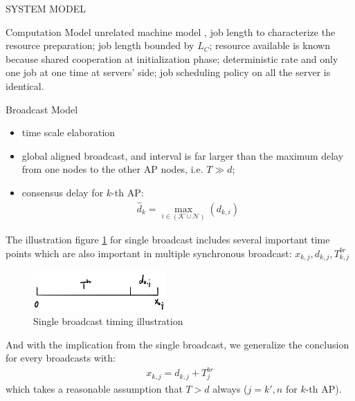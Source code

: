 \documentclass[10pt, conference, letterpaper]{IEEEtran}
\begin{document}
\begin{section}{SYSTEM MODEL}
        \begin{subsection}{Computation Model}
            unrelated machine model \cite{tan-online}, job length to characterize the resource preparation;
            job length bounded by $L_C$;
            resource available is known because shared cooperation at initialization phase;
            deterministic rate and only one job at one time at servers' side;
            job scheduling policy on all the server is identical.
        \end{subsection}

        \begin{subsection}{Broadcast Model}
            \begin{itemize}
                \item time scale elaboration
                \item global aligned broadcast, and interval is far larger than the maximum delay from one nodes to the other AP nodes, i.e. $T \gg d$;
                \item consensus delay for $k$-th AP:
                    \begin{align}
                        \hat{d}_k = \max_{i\in(\mathcal{K} \cup \mathcal{N})}(d_{k,i})
                    \end{align}
            \end{itemize}
            The illustration figure \ref{fig:brd} for single broadcast includes several important time points which are also important in multiple synchronous broadcast: $x_{k,j}, d_{k,j}, T^{br}_{k,j}$
            \begin{figure}[ht]
                \centering
                \includegraphics[width=0.45\textwidth]{single-broadcast.png}
                \caption{Single broadcast timing illustration}
                \label{fig:brd}
            \end{figure}
            And with the implication from the single broadcast, we generalize the conclusion for every broadcasts with:
            \begin{align}
                x_{k,j} = d_{k,j} + T^{br}_{j}
            \end{align}
            which takes a reasonable assumption that $T>d$ always ($j=k',n$ for $k$-th AP).
        \end{subsection}
    \end{section}
\end{document}
